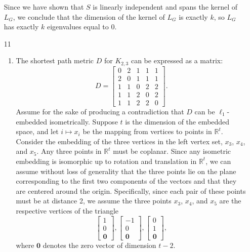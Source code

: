 \documentclass{article}
\newcommand{\R}{\mathbb{R}}
\newcommand{\1}{\mathbf{1}}
\newcommand{\0}{\mathbf{0}}
\begin{document}
\begin{enumerate}
      Since we have shown that $S$ is linearly independent and spans the kernel of $L_G$, we conclude that the dimension of the kernel of $L_G$ is exactly $k$, so $L_G$ has exactly $k$ eigenvalues equal to $0$.
    \item[11]
      \begin{enumerate}
      \item
        The shortest path metric $D$ for $K_{2,3}$ can be expressed as a matrix:
        \begin{equation*}
          D =
          \begin{bmatrix}
            0 & 2 & 1 & 1 & 1 \\
            2 & 0 & 1 & 1 & 1 \\
            1 & 1 & 0 & 2 & 2 \\
            1 & 1 & 2 & 0 & 2 \\
            1 & 1 & 2 & 2 & 0
          \end{bmatrix}
          .
        \end{equation*}
        Assume for the sake of producing a contradiction that $D$ can be $\ell_1$-embedded isometrically.
        Suppose $t$ is the dimension of the embedded space, and let $i \mapsto x_i$ be the mapping from vertices to points in $\R^t$.
        Consider the embedding of the three vertices in the left vertex set, $x_3$, $x_4$, and $x_5$.
        Any three points in $\R^t$ must be coplanar.
        Since any isometric embedding is isomorphic up to rotation and translation in $\R^t$, we can assume without loss of generality that the three points lie on the plane corresponding to the first two components of the vectors and that they are centered around the origin.
        Specifically, since each pair of these points must be at distance 2, we assume the three points $x_3$, $x_4$, and $x_5$ are the respective vertices of the triangle
        \begin{equation*}
          \begin{bmatrix}
            1 \\ 0 \\ \0
          \end{bmatrix},
          \begin{bmatrix}
            -1 \\ 0 \\ \0
          \end{bmatrix},
          \begin{bmatrix}
            0 \\ 1 \\ \0
          \end{bmatrix},
        \end{equation*}
        where $\0$ denotes the zero vector of dimension $t - 2$.


\end{enumerate}
\end{enumerate}
\end{document}

